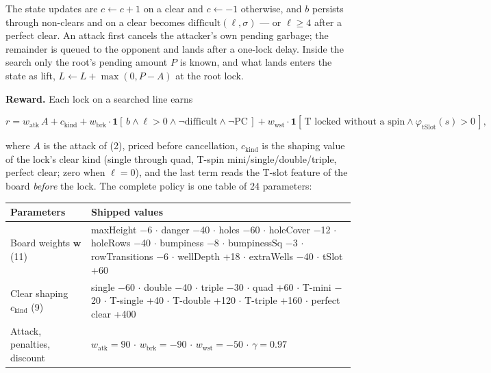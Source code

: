 \documentclass[
  11pt,
]{article}
\newcounter{none} %
\begin{document}
The state updates are \(c \leftarrow c + 1\) on a clear and
\(c \leftarrow -1\) otherwise, and \(b\) persists through non-clears and
on a clear becomes \(\mathrm{difficult}(\ell, \sigma)\) --- or
\(\ell \ge 4\) after a perfect clear. An attack first cancels the
attacker's own pending garbage; the remainder is queued to the opponent
and lands after a one-lock delay. Inside the search only the root's
pending amount \(P\) is known, and what lands enters the state as lift,
\(L \leftarrow L + \max(0, P - A)\) at the root lock.

\textbf{Reward.} Each lock on a searched line earns

\begin{equation}r = w_{\mathrm{atk}} \, A + c_{\mathrm{kind}} + w_{\mathrm{brk}} \cdot \mathbf{1}[\,b \wedge \ell > 0 \wedge \neg\mathrm{difficult} \wedge \neg\mathrm{PC}\,] + w_{\mathrm{wst}} \cdot \mathbf{1}[\,\text{T locked without a spin} \wedge \varphi_{\mathrm{tSlot}}(s) > 0\,],
\end{equation}

where \(A\) is the attack of (2), priced before cancellation,
\(c_{\mathrm{kind}}\) is the shaping value of the lock's clear kind
(single through quad, T-spin mini/single/double/triple, perfect clear;
zero when \(\ell = 0\)), and the last term reads the T-slot feature of
the board \emph{before} the lock. The complete policy is one table of 24
parameters:

{\def\LTcaptype{none} %
\begin{longtable}[]{@{}
  >{\raggedright\arraybackslash}p{}
  >{\raggedright\arraybackslash}p{}@{}}
\toprule\noalign{}
\begin{minipage}[b]{\linewidth}\raggedright
Parameters
\end{minipage} & \begin{minipage}[b]{\linewidth}\raggedright
Shipped values
\end{minipage} \\
\midrule\noalign{}
\endhead
\bottomrule\noalign{}
\endlastfoot
Board weights \(\mathbf{w}\) (11) & maxHeight \(-\)6 \(\cdot\) danger \(-\)40 \(\cdot\) holes
\(-\)60 \(\cdot\) holeCover \(-\)12 \(\cdot\) holeRows \(-\)40 \(\cdot\) bumpiness \(-\)8 \(\cdot\) bumpinessSq \(-\)3 \(\cdot\)
rowTransitions \(-\)6 \(\cdot\) wellDepth +18 \(\cdot\) extraWells \(-\)40 \(\cdot\) tSlot +60 \\
Clear shaping \(c_{\mathrm{kind}}\) (9) & single \(-\)60 \(\cdot\) double \(-\)40 \(\cdot\)
triple \(-\)30 \(\cdot\) quad +60 \(\cdot\) T-mini \(-\)20 \(\cdot\) T-single +40 \(\cdot\) T-double +120 \(\cdot\)
T-triple +160 \(\cdot\) perfect clear +400 \\
Attack, penalties, discount & \(w_{\mathrm{atk}} = 90\) \(\cdot\)
\(w_{\mathrm{brk}} = -90\) \(\cdot\) \(w_{\mathrm{wst}} = -50\) \(\cdot\)
\(\gamma = 0.97\) \\
\end{longtable}
}
\end{document}

